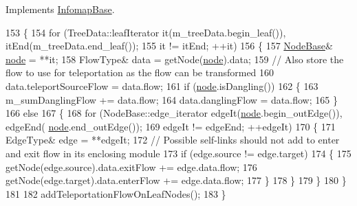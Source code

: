 Implements \mbox{\hyperlink{classInfomapBase_a689210ed8f0eaeb767dc1321dfec65f5}{Infomap\+Base}}.


\begin{DoxyCode}
153 \{
154     \textcolor{keywordflow}{for} (TreeData::leafIterator it(m\_treeData.begin\_leaf()), itEnd(m\_treeData.end\_leaf());
155             it != itEnd; ++it)
156     \{
157         \mbox{\hyperlink{classNodeBase}{NodeBase}}& \mbox{\hyperlink{structnode}{node}} = **it;
158         FlowType& data = getNode(\mbox{\hyperlink{structnode}{node}}).data;
159         \textcolor{comment}{// Also store the flow to use for teleportation as the flow can be transformed}
160         data.teleportSourceFlow = data.flow;
161         \textcolor{keywordflow}{if} (\mbox{\hyperlink{structnode}{node}}.isDangling())
162         \{
163             m\_sumDanglingFlow += data.flow;
164             data.danglingFlow = data.flow;
165         \}
166         \textcolor{keywordflow}{else}
167         \{
168             \textcolor{keywordflow}{for} (NodeBase::edge\_iterator edgeIt(\mbox{\hyperlink{structnode}{node}}.begin\_outEdge()), edgeEnd(
      \mbox{\hyperlink{structnode}{node}}.end\_outEdge());
169                     edgeIt != edgeEnd; ++edgeIt)
170             \{
171                 EdgeType& edge = **edgeIt;
172                 \textcolor{comment}{// Possible self-links should not add to enter and exit flow in its enclosing module}
173                 \textcolor{keywordflow}{if} (edge.source != edge.target)
174                 \{
175                     getNode(edge.source).data.exitFlow += edge.data.flow;
176                     getNode(edge.target).data.enterFlow += edge.data.flow;
177                 \}
178             \}
179         \}
180     \}
181 
182     addTeleportationFlowOnLeafNodes();
183 \}
\end{DoxyCode}
\mbox{\label{classInfomapGreedySpecialized_a6f4ff75d89a26f1b474ca5a2190878c7}} 
